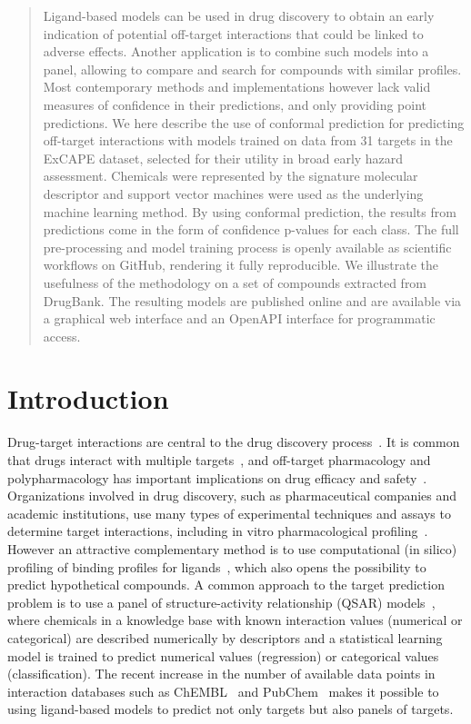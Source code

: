 \documentclass[10pt,article]{memoir}
\renewcommand{\todo}[1]{{\color{magenta}\oldtodo[fancyline]{\color{white}\textsf{#1}}}}
\begin{document}
\begin{abstract}
\noindent
Ligand-based models can be used in drug discovery to obtain an early indication
of potential off-target interactions that could be linked to adverse
effects. Another application is to combine such models into a panel,
allowing to compare  and search for compounds with similar profiles. Most
contemporary methods and implementations however lack valid measures of
confidence in their predictions, and only providing point predictions. We here
describe the use of conformal prediction for predicting off-target
interactions with models trained on data from 31 targets in the ExCAPE
dataset, selected for their utility in broad early hazard assessment.
Chemicals were represented by the signature molecular descriptor and
support vector machines were used as the underlying machine learning method.
By using conformal prediction, the results from predictions come in the
form of confidence p-values for each class. The full pre-processing and
model training process is openly available as scientific workflows on
GitHub, rendering it fully reproducible. We illustrate the usefulness of
the methodology on a set of compounds extracted from DrugBank. The
resulting models are published online and are available via a graphical web
interface and an OpenAPI interface for programmatic access.

\end{abstract}

\section*{Introduction}

Drug-target interactions are central to the drug discovery
process~\cite{Yildirim:2007vh}. It is common that drugs interact with multiple
targets~\cite{hopkins2008network}, and off-target pharmacology and
polypharmacology has important implications on drug efficacy and
safety~\cite{Peters:2013yg,Ravikumar:2018qd}. Organizations involved in drug
discovery, such as pharmaceutical companies and academic institutions, use many
types of experimental techniques and assays to determine target interactions,
including in vitro pharmacological profiling~\cite{Bowes2012}. However an
attractive complementary method is to use computational (in silico) profiling
of binding profiles for ligands~\cite{Cereto-Massague:2015px}, which also opens the possibility
to predict hypothetical compounds. A common approach to the target prediction
problem is to use a panel of structure-activity relationship (QSAR)
models~\cite{HanschQSAR}, where chemicals in a knowledge base with known
interaction values (numerical or categorical) are described numerically by
descriptors and a statistical learning model is trained to predict numerical
values (regression) or categorical values (classification). The recent increase
in the number of available data points in interaction databases such as ChEMBL~\cite{Gaulton:2017tm} and
PubChem~\cite{Wang:2017cy} makes it possible to using ligand-based models to predict not only targets but also panels of targets.
\end{document}
